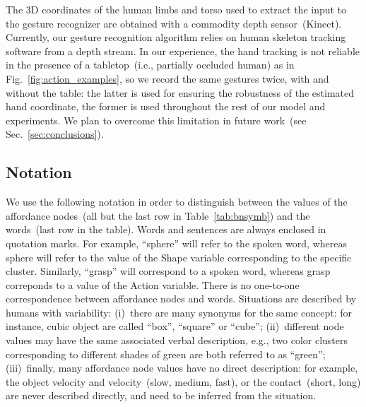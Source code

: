 The 3D coordinates of the human limbs and torso used to extract the input to the gesture recognizer are obtained with a commodity depth sensor~(Kinect).
Currently, our gesture recognition algorithm relies on human skeleton tracking software from a depth stream.
In our experience, the hand tracking is not reliable in the presence of a tabletop~(i.e., partially occluded human) as in Fig.~\ref{fig:action_examples}, so we record the same gestures twice, with and without the table: the latter is used for ensuring the robustness of the estimated hand coordinate, the former is used throughout the rest of our model and experiments.
We plan to overcome this limitation in future work~(see Sec.~\ref{sec:conclusions}).


\subsection{Notation}
\label{sec:notation}
We use the following notation in order to distinguish between the values of the affordance nodes~(all but the last row in Table~\ref{tab:bnsymb}) and the words~(last row in the table).
Words and sentences are always enclosed in quotation marks.
For example, ``sphere'' will refer to the spoken word, whereas sphere will refer to the value of the Shape variable corresponding to the specific cluster.
Similarly, ``grasp'' will correspond to a spoken word, whereas grasp correponds to a value of the Action variable.
There is no one-to-one correspondence between affordance nodes and words.
Situations are described by humans with variability:
(i)~there are many synonyms for the same concept: for instance, cubic object are called ``box'', ``square'' or ``cube'';
(ii)~different node values may have the same associated verbal description, e.g., two color clusters corresponding to different shades of green are both referred to as ``green'';
(iii)~finally, many affordance node values have no direct description: for example, the object velocity and \objecthand{} velocity~(slow, medium, fast), or the \objecthand{} contact~(short, long) are never described directly, and need to be inferred from the situation.
